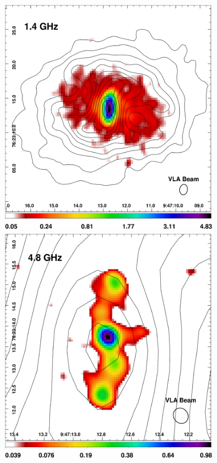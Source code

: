 \begin{figure}
\begin{center}
\begin{minipage}{0.495\linewidth}
   \end{minipage}
   \begin{minipage}{0.495\linewidth}
      \includegraphics*[width=\textwidth, trim=0mm 0mm 0mm 0mm, clip]{arx_1.4.ps}
    \end{minipage}
    \begin{minipage}{0.495\linewidth}
      \includegraphics*[width=\textwidth, trim=0mm 0mm 0mm 0mm, clip]{arx_4.8.ps}

\end{minipage}
\end{center}
\end{figure}
